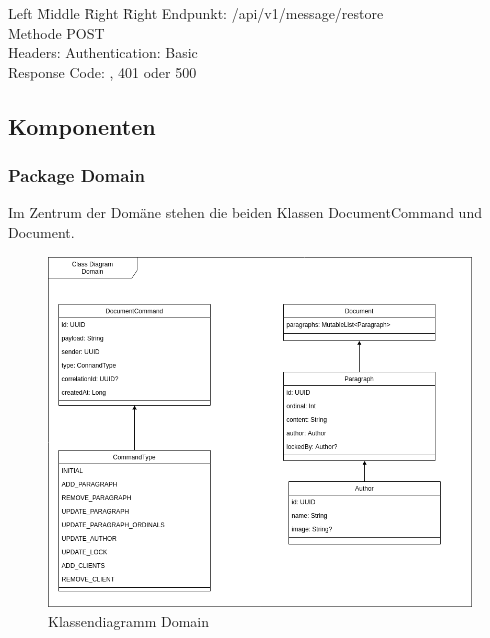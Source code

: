 \begin{tabbing}
    Left \= Middle \= Right \= Right \kill
    Endpunkt:  \> \> \> /api/v1/message/restore\\
    Methode \>  \> \> POST\\
    Headers:  \> \>   \> Authentication: Basic\\
    Response Code:  \> \>  , 401 oder 500 \\
\end{tabbing}

\clearpage

\subsection{Komponenten}

\subsubsection{Package Domain}

Im Zentrum der Domäne stehen die beiden Klassen DocumentCommand und Document.

\begin{figure}[h]
    \centering
    \begin{minipage}[b]{0.8\textwidth}
        \includegraphics[width=\textwidth]{graphics/class-be-domain.drawio}
        \caption{Klassendiagramm Domain}
    \end{minipage}
\end{figure}

